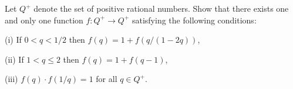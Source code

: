 Let $ Q^+$ denote the set of positive rational numbers. Show that there exists one and only one function $f: Q^+\to Q^+$ satisfying the following conditions:

(i) If $ 0<q<1/2$ then $ f(q)=1+f(q/(1-2q))$, 

(ii) If $ 1<q\le2$ then $ f(q)=1+f(q-1)$, 

(iii) $ f(q)\cdot f(1/q)=1$ for all $ q\in Q^+$.